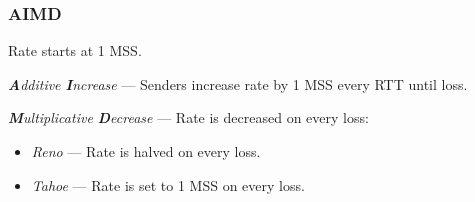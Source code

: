 \subsubsection{AIMD}

Rate starts at 1 MSS.

\textit{\textbf{A}dditive \textbf{I}ncrease} --- Senders increase rate by 1 MSS every RTT until loss.

\textit{\textbf{M}ultiplicative \textbf{D}ecrease} --- Rate is decreased on every loss:

\begin{itemize}
    \item \textit{Reno} --- Rate is halved on every loss.
    \item \textit{Tahoe} --- Rate is set to 1 MSS on every loss.
\end{itemize}